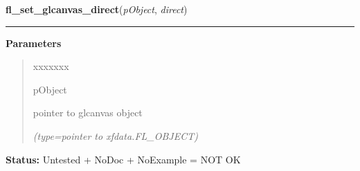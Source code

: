 \hspace{.8\funcindent}\begin{boxedminipage}{\funcwidth}

    \raggedright \textbf{fl\_set\_glcanvas\_direct}(\textit{pObject}, \textit{direct})

    \vspace{-1.5ex}

    \rule{\textwidth}{0.5\fboxrule}
\setlength{\parskip}{2ex}
\setlength{\parskip}{1ex}
      \textbf{Parameters}
      \vspace{-1ex}

      \begin{quote}
        \begin{Ventry}{xxxxxxx}

          \item[pObject]

          pointer to glcanvas object

            {\it (type=pointer to xfdata.FL\_OBJECT)}

        \end{Ventry}

      \end{quote}

\textbf{Status:} Untested + NoDoc + NoExample = NOT OK



    \end{boxedminipage}

    \label{xformslib:library:fl_activate_glcanvas}

    \vspace{0.5ex}

